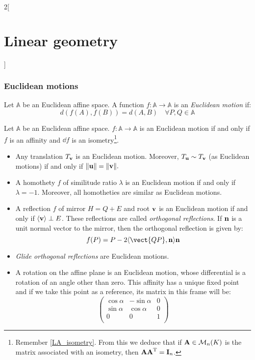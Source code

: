 \documentclass[../../../main.tex]{subfiles}
\begin{document}
\begin{multicols}{2}[\section{Linear geometry}]
  \subsubsection{Euclidean motions}
  \label{LG_euclidean_motion}
  \begin{definition}
    Let $\mathbb{A}$ be an Euclidean affine space. A function $f:\mathbb{A}\rightarrow\mathbb{A}$ is an \emph{Euclidean motion} if: $$d(f(A),f(B))=d(A,B)\quad\forall P,Q\in\mathbb{A}$$
  \end{definition}
  \begin{proposition}
    Let $\mathbb{A}$ be an Euclidean affine space. $f:\mathbb{A}\rightarrow\mathbb{A}$ is an Euclidean motion if and only if $f$ is an affinity and $\dd{f}$ is an isometry\footnote{Remember \cref{LA_isometry}. From this we deduce that if $\boldsymbol{\mathrm{A}}\in\mathcal{M}_n(K)$ is the matrix associated with an isometry, then $\boldsymbol{\mathrm{A}}\vb{\boldsymbol{\mathrm{A}}}^{\mathrm{T}}=\boldsymbol{\mathrm{I}}_n$.}.
  \end{proposition}
  \begin{proposition}
    \hfill
    \begin{itemize}
      \item Any translation $T_{\boldsymbol{\mathrm{v}}}$ is an Euclidean motion. Moreover, $T_{\boldsymbol{\mathrm{u}}}\sim T_{\boldsymbol{\mathrm{v}}}$ (as Euclidean motions) if and only if $\|\boldsymbol{\mathrm{u}}\|=\|\boldsymbol{\mathrm{v}}\|.$
      \item A homothety $f$ of similitude ratio $\lambda$ is an Euclidean motion if and only if $\lambda=-1$. Moreover, all homotheties are similar as Euclidean motions.
      \item A reflection $f$ of mirror $H=Q+E$ and root $\boldsymbol{\mathrm{v}}$ is an Euclidean motion if and only if $\langle\boldsymbol{\mathrm{v}}\rangle\perp E$. These reflections are called \emph{orthogonal reflections}. If $\boldsymbol{\mathrm{n}}$ is a unit normal vector to the mirror, then the orthogonal reflection is given by: $$f(P)=P-2\langle\vect{QP},\vf{n}\rangle\vf{n}$$
      \item \emph{Glide orthogonal reflections} are Euclidean motions.
      \item A rotation on the affine plane is an Euclidean motion, whose differential is a rotation of an angle other than zero. This affinity has a unique fixed point and if we take this point as a reference, its matrix in this frame will be: $$\begin{pmatrix}
                \cos\alpha & -\sin\alpha & 0 \\
                \sin\alpha & \cos\alpha  & 0 \\
                0          & 0           & 1 \\
              \end{pmatrix}$$
    \end{itemize}
  \end{proposition}

\end{multicols}
\end{document}
